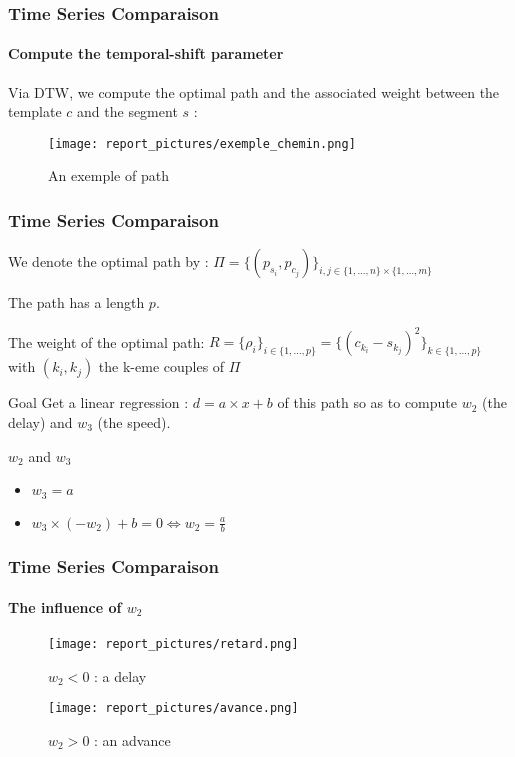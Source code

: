 \documentclass[11pt, sans, handout]{beamer}
\begin{document}
\begin{frame}
	\frametitle{Time Series Comparaison}
	\framesubtitle{Compute the temporal-shift parameter}
	
	Via DTW, we compute the optimal path and the associated weight between the template $c$ and the segment $s$ :
	
	\begin{figure}[H]
		\centering
		\texttt{[image: report\_pictures/exemple\_chemin.png]}
		\caption{An exemple of path}
		\label{ex_dist_rep}
	\end{figure}
	
\end{frame}

\begin{frame}
	\frametitle{Time Series Comparaison}
	
	We denote the optimal path by : $\Pi = \{(p_{s_i}, p_{c_j})\}_{i,j \in \{1, ..., n\} \times \{1, ..., m\} }$
	
	The path has a length $p$.
	
	The weight of the optimal path: $R = \{ \rho_i \}_{i \in \{1, ..., p\} } = \{ (c_{k_i} - s_{k_j})^2 \}_{k \in \{1, ..., p\} }$ with $(k_i,k_j)$ the k-eme couples of $\Pi$
	
	\begin{alertblock}{Goal}
		Get a linear regression : $d = a \times x + b$ of this path so as to compute $w_2$ (the delay) and $w_3$ (the speed).
	\end{alertblock}	
	
	\begin{block}{$w_2$ and $w_3$}
	\begin{itemize}
		\item $w_3=a$
		\item $w_3 \times (-w_2) + b = 0 \Leftrightarrow w_2 = \frac{a}{b}$
	\end{itemize}
	\end{block}
	
\end{frame}

\begin{frame}
	\frametitle{Time Series Comparaison}
	\framesubtitle{The influence of $w_2$}

	\begin{figure}
   	\begin{minipage}[c]{.46\linewidth}
      \texttt{[image: report\_pictures/retard.png]}
      \caption{$w_2 < 0$ : a delay}
   	\end{minipage} \hfill
   	\begin{minipage}[c]{.46\linewidth}
      \texttt{[image: report\_pictures/avance.png]}
      \caption{$w_2 > 0$ : an advance}
  	\end{minipage}
	\end{figure}

\end{frame}
\end{document}
